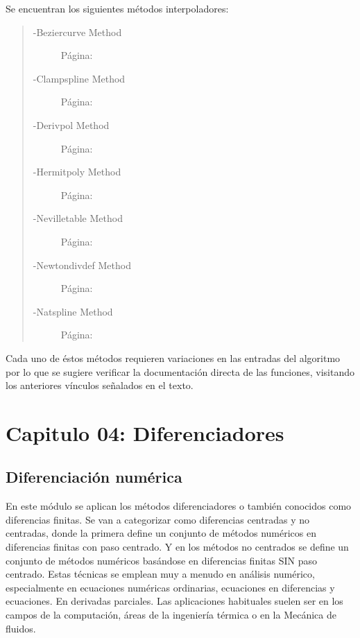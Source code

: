 \documentclass[letterpaper,10pt,oneside]{sphinxmanual}
\theoremstyle{plain}%
\theoremstyle{definition}%
\theoremstyle{remark}%
\begin{document}
Se encuentran los siguientes métodos interpoladores:
\begin{quote}
\begin{description}
\item[{-Beziercurve Method}]Página: \pageref{code:module-beziercurve}
\item[{-Clampspline Method}]Página: \pageref{code:module-clampspline}
\item[{-Derivpol Method}]Página: \pageref{code:module-derivpol}
\item[{-Hermitpoly Method}]Página: \pageref{code:module-hermitpoly}
\item[{-Nevilletable Method}]Página: \pageref{code:module-nevilletable}
\item[{-Newtondivdef Method}]Página: \pageref{code:module-newtondivdef}
\item[{-Natspline Method}]Página: \pageref{code:module-natspline}
\end{description}
\end{quote}

Cada uno de éstos métodos requieren variaciones en las entradas del algoritmo por lo que se sugiere verificar la documentación directa de las funciones, visitando los anteriores vínculos señalados en el texto.


\chapter{Capitulo 04: Diferenciadores}
\label{chapter04::doc}\label{chapter04:capitulo-04-diferenciadores}

\section{Diferenciación numérica}
\label{chapter04:Diferenciación numérica}

En este módulo se aplican los métodos diferenciadores o también conocidos como diferencias finitas. Se van a categorizar como diferencias centradas y no centradas, donde la primera define un conjunto de métodos numéricos en diferencias finitas con paso centrado. Y en los métodos no centrados se define un conjunto de métodos numéricos basándose en diferencias finitas SIN paso centrado.
Estas técnicas se emplean muy a menudo en análisis numérico, especialmente en ecuaciones numéricas ordinarias, ecuaciones en diferencias y ecuaciones.
En derivadas parciales. Las aplicaciones habituales suelen ser en los campos de la computación, áreas de la ingeniería térmica o en la Mecánica de fluidos.
\end{document}
